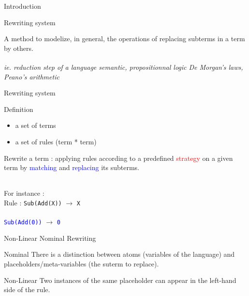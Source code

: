 




\begin{frame}{Introduction}

  \begin{block}{Rewriting system}

    A method to modelize, in general, the operations of replacing
    subterms in a term by others.\\
    ~\\

    \emph{ie. reduction step of a language semantic, propositionnal
      logic De Morgan's laws, Peano's arithmetic}
    
  \end{block}

  
\end{frame}

\begin{frame}{Rewriting system}

  \begin{block}{Definition}
    
    \begin{itemize}
      \item a set of terms 
      \item a set of rules (term * term)
    \end{itemize}

  \end{block}

  Rewrite a term : applying rules according to a predefined
  \textcolor{red}{strategy} on a given term by \textcolor{blue}{matching} and \textcolor{blue}{replacing} its subterms.

  ~\\
  For instance : \\
  Rule : \texttt{Sub(Add(X))} $\rightarrow$ \texttt{X}\\
  ~\\
  \textcolor{blue}{\texttt{Sub(Add(0))}} $ \rightarrow $ \textcolor{blue}{\texttt{0}}

\end{frame}


\begin{frame}{Non-Linear Nominal Rewriting}
  
  \begin{block}{Nominal}
    There is a distinction between atoms (variables of the language)
    and placeholders/meta-variables (the suterm to replace).
  \end{block}

  \begin{block}{Non-Linear}
    Two instances of the same placeholder
    can appear in the left-hand side of the rule. 
  \end{block}
  
\end{frame}



